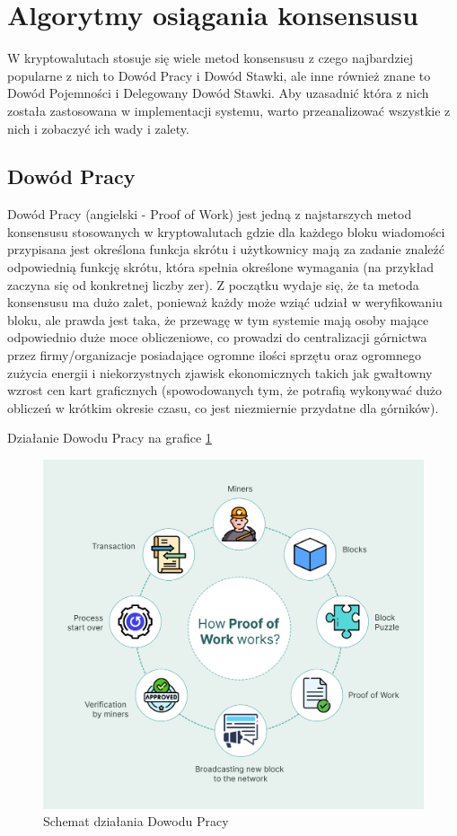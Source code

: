 \section{Algorytmy osiągania konsensusu}
W kryptowalutach stosuje się wiele metod konsensusu z czego najbardziej popularne z nich to Dowód Pracy i Dowód Stawki, ale inne również znane to Dowód Pojemności i Delegowany Dowód Stawki. Aby uzasadnić która z nich została zastosowana w implementacji systemu, warto przeanalizować wszystkie z nich i zobaczyć ich wady i zalety.
\subsection{Dowód Pracy}
Dowód Pracy (angielski - Proof of Work) jest jedną z najstarszych metod konsensusu stosowanych w kryptowalutach gdzie dla każdego bloku wiadomości przypisana jest określona funkcja skrótu i użytkownicy mają za zadanie znaleźć odpowiednią funkcję skrótu, która spełnia określone wymagania (na przykład zaczyna się od konkretnej liczby zer). Z początku wydaje się, że ta metoda konsensusu ma dużo zalet, ponieważ każdy może wziąć udział w weryfikowaniu bloku, ale prawda jest taka, że przewagę w tym systemie mają osoby mające odpowiednio duże moce obliczeniowe, co prowadzi do centralizacji górnictwa przez firmy/organizacje posiadające ogromne ilości sprzętu oraz ogromnego zużycia energii i niekorzystnych zjawisk ekonomicznych takich jak gwałtowny wzrost cen kart graficznych (spowodowanych tym, że potrafią wykonywać dużo obliczeń w krótkim okresie czasu, co jest niezmiernie przydatne dla górników).

\vspace{0.3\baselineskip}

Działanie Dowodu Pracy na grafice \ref{fig:ConsesnsusProofOfWork}
\begin{figure}[H]
    \centering
    \includegraphics[width=\textwidth]{Images/ConsesnsusProofOfWork.png}
    \caption{Schemat działania Dowodu Pracy}
    \label{fig:ConsesnsusProofOfWork}
\end{figure}
